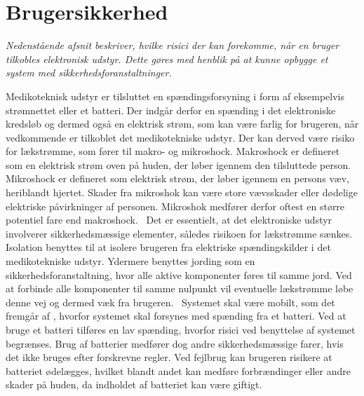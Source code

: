 \section{Brugersikkerhed}
\textit{Nedenstående afsnit beskriver, hvilke risici der kan forekomme, når en bruger tilkobles elektronisk udstyr. Dette gøres med henblik på at kunne opbygge et system med sikkerhedsforanstaltninger.}

Medikoteknisk udstyr er tilsluttet en spændingsforsyning i form af eksempelvis strømnettet eller et batteri. Der indgår derfor en spænding i det elektroniske kredsløb og dermed også en elektrisk strøm, som kan være farlig for brugeren, når vedkommende er tilkoblet det medikotekniske udstyr. Der kan derved være risiko for lækstrømme, som fører til makro- og mikroshock. Makroshock er defineret som en elektrisk strøm oven på huden, der løber igennem den tilsluttede person. Mikroshock er defineret som elektrisk strøm, der løber igennem en persons væv, heriblandt hjertet. Skader fra mikroshok kan være store vævsskader eller dødelige elektriske påvirkninger af personen. Mikroshok medfører derfor oftest en større potentiel fare end makroshock.~\citep{Webster2011} \newline
Det er essentielt, at det elektroniske udstyr involverer sikkerhedsmæssige elementer, således risikoen for lækstrømme sænkes. Isolation benyttes til at isolere brugeren fra elektriske spændingskilder i det medikotekniske udstyr. Ydermere benyttes jording som en sikkerhedsforanstaltning, hvor alle aktive komponenter føres til samme jord. Ved at forbinde alle komponenter til samme nulpunkt vil eventuelle lækstrømme løbe denne vej og dermed væk fra brugeren.~\citep{Webster2011} \newline 
Systemet skal være mobilt, som det fremgår af , hvorfor systemet skal forsynes med spænding fra et batteri. Ved at bruge et batteri tilføres en lav spænding, hvorfor risici ved benyttelse af systemet begrænses. Brug af batterier medfører dog andre sikkerhedsmæssige farer, hvis det ikke bruges efter forskrevne regler. Ved fejlbrug kan brugeren risikere at batteriet ødelægges, hvilket blandt andet kan medføre forbrændinger eller andre skader på huden, da indholdet af batteriet kan være giftigt.~\citep{NREL2011}